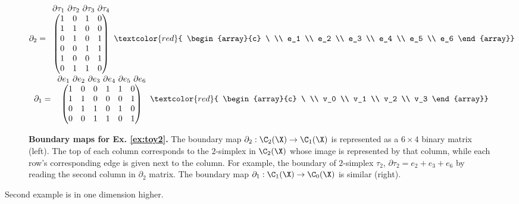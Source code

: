 \begin{figure}
\vspace{-.1in}
\footnotesize
$\partial_2 = 
\begin{array}{c}
\partial \tau_1\ \partial \tau_2 \ \partial \tau_3 \ \partial \tau_4 \\ %
\begin{pmatrix}
1 & 0 & 1 & 0 \\ %
1 & 1 & 0 & 0 \\ %
0 & 1 & 0 & 1 \\ %
0 & 0 & 1 & 1\\ %
1 & 0 & 0 & 1 \\ %
0 & 1 & 1 & 0   %
\end{pmatrix} 
\end{array}
\textcolor{red}{
\begin{array}{c}
\ \\
e_1 \\
e_2 \\
e_3 \\
e_4 \\
e_5 \\
e_6
\end{array}}$ \ 
$\partial_1 = 
\begin{array}{c}
\partial e_1 \ \partial e_2 \ \partial e_3 \ \partial e_4 \ \partial e_5 \ \partial e_6 \\
\begin{pmatrix}
1 & 0 & 0 & 1 & 1& 0 \\ %
1 & 1 & 0 & 0 & 0 & 1 \\ %
0 & 1 & 1 & 0 & 1 & 0\\ %
0 & 0 & 1 & 1 & 0 & 1\\ %
\end{pmatrix} 
\end{array}
\textcolor{red}{
\begin{array}{c}
\ \\
v_0 \\
v_1 \\
v_2 \\
v_3
\end{array}}$
\caption{\footnotesize {\bf Boundary maps for Ex. \ref{ex:toy2}.} The boundary map $\partial_2:\C_2(\X)\to\C_1(\X)$ is represented as a $6\times 4$ binary matrix (left). The top of each column corresponds to the $2$-simplex in $\C_2(\X)$ whose image is represented by that column, while each row's corresponding edge is given next to the column. For example, the boundary of $2$-simplex $\tau_2$, $\partial\tau_2= e_2+e_3+e_6$ by reading the second column in $\partial_2$ matrix. The boundary map $\partial_1:\C_1(\X)\to\C_0(\X)$ is similar (right). \label{fig:matrix2}}
\vspace{-.2in}
\end{figure}
Second example is in one dimension higher.

